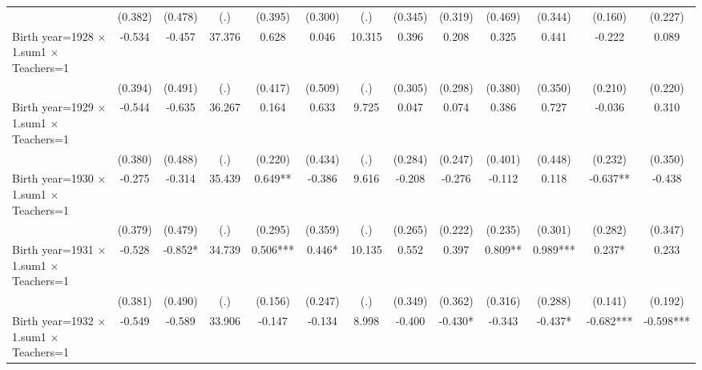 {\begin{tabular}{l*{12}{c}}
                    &     (0.382)   &     (0.478)   &         (.)   &     (0.395)   &     (0.300)   &         (.)   &     (0.345)   &     (0.319)   &     (0.469)   &     (0.344)   &     (0.160)   &     (0.227)   \\
Birth year=1928 $\times$ 1.sum1 $\times$ Teachers=1&      -0.534   &      -0.457   &      37.376   &       0.628   &       0.046   &      10.315   &       0.396   &       0.208   &       0.325   &       0.441   &      -0.222   &       0.089   \\
                    &     (0.394)   &     (0.491)   &         (.)   &     (0.417)   &     (0.509)   &         (.)   &     (0.305)   &     (0.298)   &     (0.380)   &     (0.350)   &     (0.210)   &     (0.220)   \\
Birth year=1929 $\times$ 1.sum1 $\times$ Teachers=1&      -0.544   &      -0.635   &      36.267   &       0.164   &       0.633   &       9.725   &       0.047   &       0.074   &       0.386   &       0.727   &      -0.036   &       0.310   \\
                    &     (0.380)   &     (0.488)   &         (.)   &     (0.220)   &     (0.434)   &         (.)   &     (0.284)   &     (0.247)   &     (0.401)   &     (0.448)   &     (0.232)   &     (0.350)   \\
Birth year=1930 $\times$ 1.sum1 $\times$ Teachers=1&      -0.275   &      -0.314   &      35.439   &       0.649** &      -0.386   &       9.616   &      -0.208   &      -0.276   &      -0.112   &       0.118   &      -0.637** &      -0.438   \\
                    &     (0.379)   &     (0.479)   &         (.)   &     (0.295)   &     (0.359)   &         (.)   &     (0.265)   &     (0.222)   &     (0.235)   &     (0.301)   &     (0.282)   &     (0.347)   \\
Birth year=1931 $\times$ 1.sum1 $\times$ Teachers=1&      -0.528   &      -0.852*  &      34.739   &       0.506***&       0.446*  &      10.135   &       0.552   &       0.397   &       0.809** &       0.989***&       0.237*  &       0.233   \\
                    &     (0.381)   &     (0.490)   &         (.)   &     (0.156)   &     (0.247)   &         (.)   &     (0.349)   &     (0.362)   &     (0.316)   &     (0.288)   &     (0.141)   &     (0.192)   \\
Birth year=1932 $\times$ 1.sum1 $\times$ Teachers=1&      -0.549   &      -0.589   &      33.906   &      -0.147   &      -0.134   &       8.998   &      -0.400   &      -0.430*  &      -0.343   &      -0.437*  &      -0.682***&      -0.598***\\

\end{tabular}}
